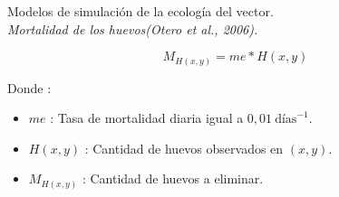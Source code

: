 {
\begin{frame}[c]{Modelos de simulación de la ecología del vector.\\\textit{Mortalidad de los huevos(Otero et al., 2006).}}
  \begin{center}
      \begin{equation}
          M_{H(x,y)} = me * H(x,y)
      \end{equation}
  \end{center}
  Donde :
    \begin{itemize}
      \item $me$ : Tasa de mortalidad diaria igual a $0,01\  \text{días}^{-1}$.
      \item $H(x, y)$ : Cantidad de huevos observados en $(x,y)$.
      \item $M_{H(x,y)}$ : Cantidad de huevos a eliminar.
    \end{itemize}
\end{frame}
}

